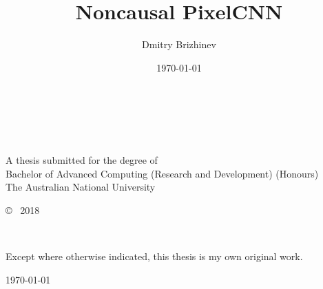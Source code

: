 \documentclass[11pt, a4paper]{book}
\title{Noncausal PixelCNN}
\author{Dmitry Brizhinev}
\date{\today}
\begin{document}
\pagestyle{empty}
\thispagestyle{empty}

\begin{titlepage}
  \enlargethispage{2cm}
  \begin{center}
    \makeatletter
    \Huge\textbf{\@title} \\[.4cm]
    \Huge\textbf{\thesisqualifier} \\[2.5cm]
    \huge\textbf{\@author} \\[9cm]
    \makeatother
    \LARGE A thesis submitted for the degree of \\
    Bachelor of Advanced Computing (Research and Development) (Honours) \\
    The Australian National University \\[2cm]
    \thismonth
  \end{center}
\end{titlepage}


\vspace*{14cm}
\begin{center}
  \makeatletter
  \copyright\ \@author{} 2018
  \makeatother
\end{center}
\noindent
\begin{center}
  \footnotesize{~} %
\end{center}
\noindent

\newpage

\vspace*{7cm}
\begin{center}
  Except where otherwise indicated, this thesis is my own original
  work.
\end{center}

\vspace*{4cm}

\hspace{8cm}\makeatletter\@author\makeatother\par
\hspace{8cm}\today
\end{document}
